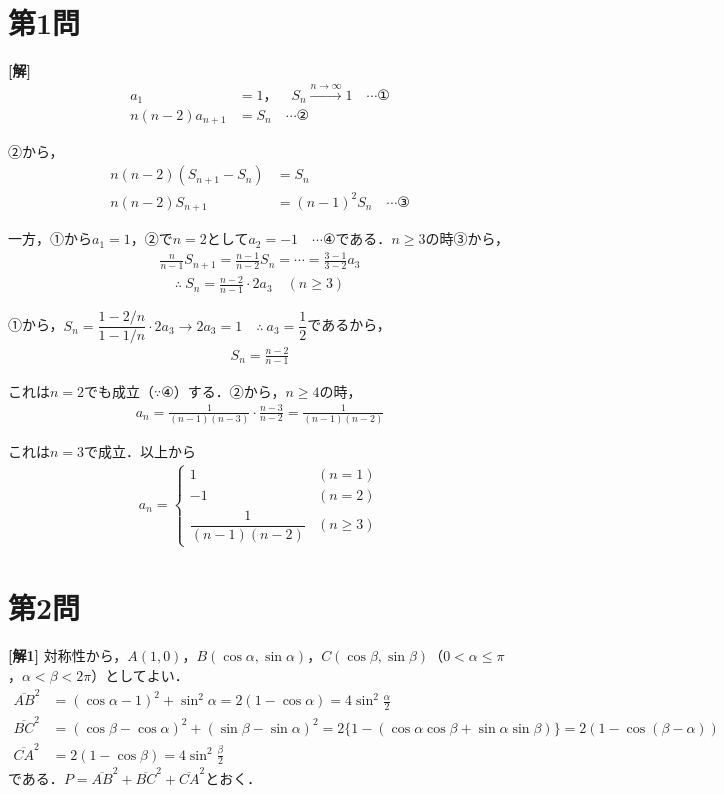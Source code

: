 \documentclass[../main.tex]{subfiles}
\begin{document}
\section*{第1問}

{\bf [解]}
\begin{align*}
  a_1&=1，\quad S_n\xrightarrow{n\to\infty}1\quad\cdots①\\
  n(n-2)a_{n+1}&=S_n\quad\cdots②
\end{align*}

②から，
\begin{align*}
  n(n-2)(S_{n+1}-S_n)&=S_n\\
  n(n-2)S_{n+1}&=(n-1)^2S_n\quad\cdots③
\end{align*}

一方，①から$a_1=1$，②で$n=2$として$a_2=-1\quad\cdots④$である．$n\ge3$の時③から，
\begin{align*}
  \frac n{n-1}S_{n+1}=\frac{n-1}{n-2}S_n=\cdots=\frac{3-1}{3-2}a_3
\end{align*}
\begin{align*}
  \therefore\ S_n=\frac{n-2}{n-1}\cdot2a_3\quad(n\ge3)
\end{align*}

①から，$S_n=\dfrac{1-2/n}{1-1/n}\cdot2a_3\longrightarrow2a_3=1\quad\therefore\ a_3=\dfrac12$であるから，
\begin{align*}
  S_n=\frac{n-2}{n-1}
\end{align*}

これは$n=2$でも成立（$\because④$）する．②から，$n\ge4$の時，
\begin{align*}
  a_n=\frac1{(n-1)(n-3)}\cdot\frac{n-3}{n-2}=\frac1{(n-1)(n-2)}
\end{align*}

これは$n=3$で成立．以上から
\begin{align*}
  a_n=
  \begin{cases}1&(n=1)\\-1&(n=2)\\\dfrac1{(n-1)(n-2)}&(n\ge3)
  \end{cases}
\end{align*}

\newpage

\section*{第2問}

{\bf [解1]}
対称性から，$A(1,0)$，$B(\cos\alpha,\sin\alpha)$，$C(\cos\beta,\sin\beta)$（$0<\alpha\le\pi$，$\alpha<\beta<2\pi$）としてよい．
\begin{align*}
  \overline{AB}^2&=(\cos\alpha-1)^2+\sin^2\alpha=2(1-\cos\alpha)=4\sin^2\frac\alpha2\\
  \overline{BC}^2&=(\cos\beta-\cos\alpha)^2+(\sin\beta-\sin\alpha)^2=2\{1-(\cos\alpha\cos\beta+\sin\alpha\sin\beta)\}=2(1-\cos(\beta-\alpha))\\
  \overline{CA}^2&=2(1-\cos\beta)=4\sin^2\frac\beta2
\end{align*}
である．$P=\overline{AB}^2+\overline{BC}^2+\overline{CA}^2$とおく．
\end{document}
